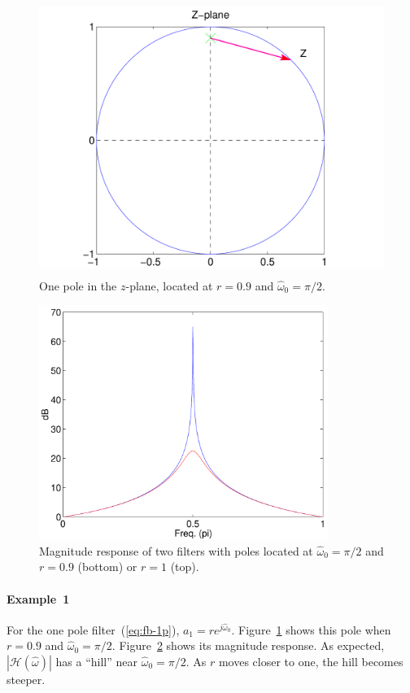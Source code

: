 \begin{figure}
\centerline{\includegraphics[height=3.5in]{ch-iir/fbexp_1p_c90}}
\caption{One pole in the $z$-plane, located at $r=0.9$ and
$\hat{\omega}_0=\pi/2$.\label{fig:fb-exp1pc90}}
\end{figure}

\begin{figure}
\centerline{\includegraphics[height=3in]{ch-iir/fbexp_1p_h90_r1_r0-9}}
\caption[Magnitude response of two filters]{Magnitude response of two
  filters with poles located at $\hat{\omega}_0=\pi/2$ and $r=0.9$
  (bottom) or $r=1$ (top).\label{fig:fb-exp1ph90r2}}
\end{figure}

\paragraph*{Example~1} 
For the one pole filter~(\ref{eq:fb-1p}),
$a_1=re^{j\hat{\omega}_0}$. Figure~\ref{fig:fb-exp1pc90} shows this
pole when $r=0.9$ and
$\hat{\omega}_0=\pi/2$. Figure~\ref{fig:fb-exp1ph90r2} shows its
magnitude response. As expected, $|\mathcal{H}(\hat{\omega})|$ has a
``hill'' near $\hat{\omega}_0=\pi/2$. As $r$ moves closer to one, the
hill becomes steeper.

